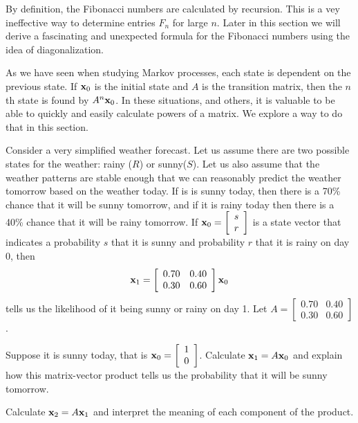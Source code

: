 By definition, the Fibonacci numbers are calculated by recursion. This is a vey ineffective way to determine entries $F_n$ for large $n$. Later in this section we will derive a fascinating and unexpected formula for the Fibonacci numbers using the idea of diagonalization. 


\label{sec:diag_intro}

As we have seen when studying Markov processes, each state is dependent on the previous state. If $\mathbf{x}_0$ is the initial state and $A$ is the transition matrix, then the $n$th state is found by $A^n \mathbf{x}_0$. In these situations, and others, it is valuable to be able to quickly and easily calculate powers of a matrix. We explore a way to do that in this section. 

\begin{pa} \label{pa:4_c} Consider a very simplified weather forecast. Let us assume there are two possible states for the weather: rainy ($R$) or sunny($S$). Let us also assume that the weather patterns are stable enough that we can reasonably predict the weather tomorrow based on the weather today. If is is sunny today, then there is a 70\% chance that it will be sunny tomorrow, and if it is rainy today then there is a 40\% chance that it will be rainy tomorrow. If $\mathbf{x}_0 = \left[ \begin{array}{c} s \\ r \end{array} \right]$ is a state vector that indicates a probability $s$ that it is sunny and probability $r$ that it is rainy on day $0$, then 
\[\mathbf{x}_1 = \left[ \begin{array}{cc} 0.70&0.40 \\ 0.30&0.60 \end{array} \right] \mathbf{x}_0\]
tells us the likelihood of it being sunny or rainy on day 1. Let $A = \left[ \begin{array}{cc} 0.70&0.40 \\ 0.30&0.60 \end{array} \right]$.  
\be
\item Suppose it is sunny today, that is $\mathbf{x}_0 = \left[ \begin{array}{c} 1 \\ 0 \end{array} \right]$. Calculate $\mathbf{x}_1 = A \mathbf{x}_0$ and explain how this matrix-vector product tells us the probability that it will be sunny tomorrow.

\item Calculate $\mathbf{x}_2 = A\mathbf{x}_1$ and interpret the meaning of each component of the product.  


\end{pa}
